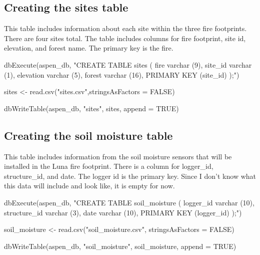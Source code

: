 \documentclass[
]{book}
\newenvironment{Shaded}{\begin{snugshade}}{\end{snugshade}}
\newcommand{\AttributeTok}[1]{\textcolor[rgb]{0.77,0.63,0.00}{#1}}
\newcommand{\ConstantTok}[1]{\textcolor[rgb]{0.00,0.00,0.00}{#1}}
\newcommand{\FunctionTok}[1]{\textcolor[rgb]{0.00,0.00,0.00}{#1}}
\newcommand{\NormalTok}[1]{#1}
\newcommand{\OtherTok}[1]{\textcolor[rgb]{0.56,0.35,0.01}{#1}}
\newcommand{\StringTok}[1]{\textcolor[rgb]{0.31,0.60,0.02}{#1}}
\begin{document}
\hypertarget{creating-the-sites-table}{%
\subsection{Creating the sites table}\label{creating-the-sites-table}}

This table includes information about each site within the three fire footprints. There are four sites total. The table includes columns for fire footprint, site id, elevation, and forest name. The primary key is the fire.

\begin{Shaded}
\begin{Highlighting}[]
\FunctionTok{dbExecute}\NormalTok{(aspen\_db, }\StringTok{"CREATE TABLE sites (}
\StringTok{fire varchar (9), }
\StringTok{site\_id varchar (1), }
\StringTok{elevation varchar (5), }
\StringTok{forest varchar (16),}
\StringTok{PRIMARY KEY (site\_id)}
\StringTok{);"}\NormalTok{)}

\NormalTok{sites }\OtherTok{\textless{}{-}} \FunctionTok{read.csv}\NormalTok{(}\StringTok{"sites.csv"}\NormalTok{,}\AttributeTok{stringsAsFactors =} \ConstantTok{FALSE}\NormalTok{)}

\FunctionTok{dbWriteTable}\NormalTok{(aspen\_db, }\StringTok{"sites"}\NormalTok{, sites, }\AttributeTok{append =} \ConstantTok{TRUE}\NormalTok{)}
\end{Highlighting}
\end{Shaded}

\hypertarget{creating-the-soil-moisture-table}{%
\subsection{Creating the soil moisture table}\label{creating-the-soil-moisture-table}}

This table includes information from the soil moisture sensors that will be installed in the Luna fire footprint. There is a column for logger\_id, structure\_id, and date. The logger id is the primary key. Since I don't know what this data will include and look like, it is empty for now.

\begin{Shaded}
\begin{Highlighting}[]
\FunctionTok{dbExecute}\NormalTok{(aspen\_db, }\StringTok{"CREATE TABLE soil\_moisture (}
\StringTok{logger\_id varchar (10), }
\StringTok{structure\_id varchar (3), }
\StringTok{date varchar (10),}
\StringTok{PRIMARY KEY (logger\_id)}
\StringTok{);"}\NormalTok{)}

\NormalTok{soil\_moisture }\OtherTok{\textless{}{-}} \FunctionTok{read.csv}\NormalTok{(}\StringTok{"soil\_moisture.csv"}\NormalTok{, }\AttributeTok{stringsAsFactors =} \ConstantTok{FALSE}\NormalTok{)}

\FunctionTok{dbWriteTable}\NormalTok{(aspen\_db, }\StringTok{"soil\_moisture"}\NormalTok{, soil\_moisture, }\AttributeTok{append =} \ConstantTok{TRUE}\NormalTok{)}
\end{Highlighting}
\end{Shaded}
\end{document}
